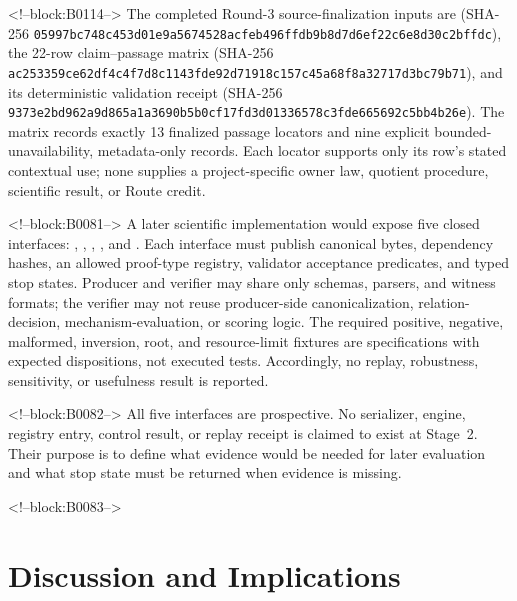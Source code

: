 \documentclass[11pt,a4paper]{article}
\begin{document}
<!--block:B0114-->
The completed Round-3 source-finalization inputs are
 (SHA-256
\texttt{05997bc7\allowbreak{}48c453d0\allowbreak{}1e9a5674\allowbreak{}528acfeb\allowbreak{}496ffdb9\allowbreak{}b8d7d6ef\allowbreak{}22c6e8d3\allowbreak{}0c2bffdc}), the 22-row claim--passage matrix
 (SHA-256
\texttt{ac253359\allowbreak{}ce62df4c\allowbreak{}4f7d8c11\allowbreak{}43fde92d\allowbreak{}71918c15\allowbreak{}7c45a68f\allowbreak{}8a32717d\allowbreak{}3bc79b71}), and its deterministic validation receipt
 (SHA-256
\texttt{9373e2bd\allowbreak{}962a9d86\allowbreak{}5a1a3690\allowbreak{}b5b0cf17\allowbreak{}fd3d0133\allowbreak{}6578c3fd\allowbreak{}e665692c\allowbreak{}5bb4b26e}).  The matrix records exactly 13 finalized
passage locators and nine explicit bounded-unavailability, metadata-only records.
Each locator supports only its row's stated contextual use; none supplies a
project-specific owner law, quotient procedure, scientific result, or Route credit.
\par\endgroup

<!--block:B0081-->
A later scientific implementation would expose five closed interfaces: , , , , and . Each interface must publish canonical bytes, dependency hashes, an allowed proof-type registry, validator acceptance predicates, and typed stop states. Producer and verifier may share only schemas, parsers, and witness formats; the verifier may not reuse producer-side canonicalization, relation-decision, mechanism-evaluation, or scoring logic. The required positive, negative, malformed, inversion, root, and resource-limit fixtures are specifications with expected dispositions, not executed tests. Accordingly, no replay, robustness, sensitivity, or usefulness result is reported.

<!--block:B0082-->
All five interfaces are prospective. No serializer, engine, registry entry, control result, or replay receipt is claimed to exist at Stage~2. Their purpose is to define what evidence would be needed for later evaluation and what stop state must be returned when evidence is missing.

<!--block:B0083-->
\section{Discussion and Implications}
\end{document}
